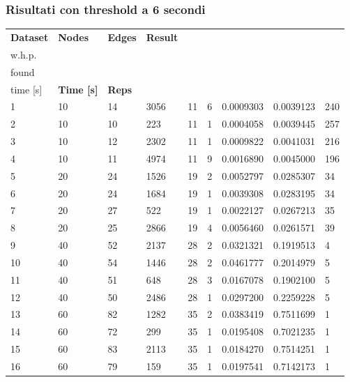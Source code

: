 \subsubsection{Risultati con threshold a 6 secondi}
\begin{longtable}{lllllllll}
  \textbf{Dataset} & \textbf{Nodes} & \textbf{Edges} & \textbf{Result} & \textbf{\begin{tabular}[c]{@{}l@{}}Rep\\ w.h.p.\end{tabular}} & \textbf{\begin{tabular}[c]{@{}l@{}}Mincut\\ found\end{tabular}} & \textbf{\begin{tabular}[c]{@{}l@{}}Discovery\\ time {[}s{]}\end{tabular}} & \textbf{Time {[}s{]}} & \textbf{Reps} \\
  \endhead
  1 & 10 & 14 & 3056 & 11 & 6 & 0.0009303 & 0.0039123 & 240 \\
  2 & 10 & 10 & 223 & 11 & 1 & 0.0004058 & 0.0039445 & 257 \\
  3 & 10 & 12 & 2302 & 11 & 1 & 0.0009822 & 0.0041031 & 216 \\
  4 & 10 & 11 & 4974 & 11 & 9 & 0.0016890 & 0.0045000 & 196 \\
  5 & 20 & 24 & 1526 & 19 & 2 & 0.0052797 & 0.0285307 & 34 \\
  6 & 20 & 24 & 1684 & 19 & 1 & 0.0039308 & 0.0283195 & 34 \\
  7 & 20 & 27 & 522 & 19 & 1 & 0.0022127 & 0.0267213 & 35 \\
  8 & 20 & 25 & 2866 & 19 & 4 & 0.0056460 & 0.0261571 & 39 \\
  9 & 40 & 52 & 2137 & 28 & 2 & 0.0321321 & 0.1919513 & 4 \\
  10 & 40 & 54 & 1446 & 28 & 2 & 0.0461777 & 0.2014979 & 5 \\
  11 & 40 & 51 & 648 & 28 & 3 & 0.0167078 & 0.1902100 & 5 \\
  12 & 40 & 50 & 2486 & 28 & 1 & 0.0297200 & 0.2259228 & 5 \\
  13 & 60 & 82 & 1282 & 35 & 2 & 0.0383419 & 0.7511699 & 1 \\
  14 & 60 & 72 & 299 & 35 & 1 & 0.0195408 & 0.7021235 & 1 \\
  15 & 60 & 83 & 2113 & 35 & 1 & 0.0184270 & 0.7514251 & 1 \\
  16 & 60 & 79 & 159 & 35 & 1 & 0.0197541 & 0.7142173 & 1 \\

\end{longtable}

